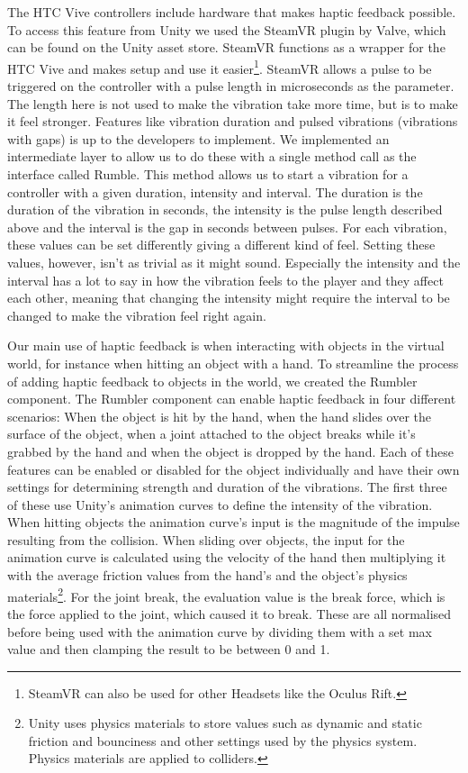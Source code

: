 The HTC Vive controllers include hardware that makes haptic feedback possible. To access this feature from Unity we used the SteamVR plugin by Valve, which can be found on the Unity asset store. SteamVR functions as a wrapper for the HTC Vive and makes setup and use it easier\footnote{SteamVR can also be used for other Headsets like the Oculus Rift.}. SteamVR allows a pulse to be triggered on the controller with a pulse length in microseconds as the parameter. The length here is not used to make the vibration take more time, but is to make it feel stronger. Features like vibration duration and pulsed vibrations (vibrations with gaps) is up to the developers to implement. We implemented an intermediate layer to allow us to do these with a single method call as the interface called Rumble. This method allows us to start a vibration for a controller with a given duration, intensity and interval. The duration is the duration of the vibration in seconds, the intensity is the pulse length described above and the interval is the gap in seconds between pulses. For each vibration, these values can be set differently giving a different kind of feel. Setting these values, however, isn't as trivial as it might sound. Especially the intensity and the interval has a lot to say in how the vibration feels to the player and they affect each other, meaning that changing the intensity might require the interval to be changed to make the vibration feel right again.

Our main use of haptic feedback is when interacting with objects in the virtual world, for instance when hitting an object with a hand. To streamline the process of adding haptic feedback to objects in the world, we created the Rumbler component. The Rumbler component can enable haptic feedback in four different scenarios: When the object is hit by the hand, when the hand slides over the surface of the object, when a joint attached to the object breaks while it's grabbed by the hand and when the object is dropped by the hand. Each of these features can be enabled or disabled for the object individually and have their own settings for determining strength and duration of the vibrations. The first three of these use Unity's animation curves to define the intensity of the vibration. When hitting objects the animation curve's input is the magnitude of the impulse resulting from the collision. When sliding over objects, the input for the animation curve is calculated using the velocity of the hand then multiplying it with the average friction values from the hand's and the object's physics materials\footnote{Unity uses physics materials to store values such as dynamic and static friction and bounciness and other settings used by the physics system. Physics materials are applied to colliders.}. For the joint break, the evaluation value is the break force, which is the force applied to the joint, which caused it to break. These are all normalised before being used with the animation curve by dividing them with a set max value and then clamping the result to be between 0 and 1.

